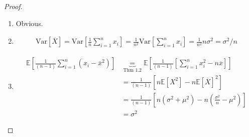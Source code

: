 \documentclass[11pt]{scrartcl}
\theoremstyle{definition}
\theoremstyle{remark}
\newcommand{\EX}[1]{\mathbb{E}\left[#1 \right]}
\begin{document}
\begin{proof}
	\begin{enumerate}[noitemsep]
		\item Obvious. 
		\item 
		\begin{align*}
			\text{Var}[\overline{X}] = \text{Var} \left[ \frac{1}{n} \sum_{i=1}^n x_i \right] = \frac{1}{n^2} \text{Var} \left[ \sum_{i=1}^n x_i \right] = \frac{1}{n^2} n \sigma^2 = \sigma^2/n	
		\end{align*}
		\item 
		\begin{align*}
			\EX{\frac{1}{(n-1)} \sum_{i=1}^n (x_i - \overline{x}^2) } & \underbrace{=}_{\text{Thm 1.2}}  \EX{\frac{1}{(n-1)} \left[ 	\sum_{i=1}^n x_i^2 - n \overline{x} 	\right] }	 \\
				& = \frac{1}{(n-1)} \left[ 	n \EX{X^2} - n \EX{\overline{X}}^2	\right] \\
				& = \frac{1}{(n-1)} \left[ 		n ( \sigma^2	 + \mu^2) - n \left( 	\frac{\sigma^2}{n} - \mu^2	\right) \right]  \\
				& = \sigma^2
		\end{align*}
	\end{enumerate}
\end{proof}
\end{document}
